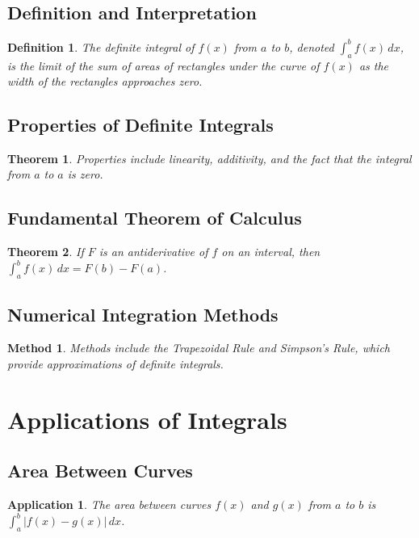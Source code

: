 \documentclass[a4paper,12pt]{book}
\newtheorem{theorem}{Theorem}
\newtheorem{application}{Application}
\newtheorem{definition}{Definition}
\newtheorem{method}{Method}
\begin{document}
\subsection{Definition and Interpretation}
\begin{definition}
The definite integral of \( f(x) \) from \( a \) to \( b \), denoted \( \int_a^b f(x) \, dx \), is the limit of the sum of areas of rectangles under the curve of \( f(x) \) as the width of the rectangles approaches zero.
\end{definition}

\subsection{Properties of Definite Integrals}
\begin{theorem}
Properties include linearity, additivity, and the fact that the integral from \( a \) to \( a \) is zero.
\end{theorem}

\subsection{Fundamental Theorem of Calculus}
\begin{theorem}
If \( F \) is an antiderivative of \( f \) on an interval, then \( \int_a^b f(x) \, dx = F(b) - F(a) \).
\end{theorem}

\subsection{Numerical Integration Methods}
\begin{method}
Methods include the Trapezoidal Rule and Simpson's Rule, which provide approximations of definite integrals.
\end{method}

\section{Applications of Integrals}
\subsection{Area Between Curves}
\begin{application}
The area between curves \( f(x) \) and \( g(x) \) from \( a \) to \( b \) is \( \int_a^b |f(x) - g(x)| \, dx \).
\end{application}
\end{document}
